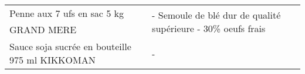 \begin{longtable}{p{5cm}p{10cm}}
                                                                  Penne aux 7 ufs en sac 5 kg GRAND MERE &                                                                                                                                                                                                                                                                                                                                                                                                                                                                                                                                                                                                                                                                                                                                                                                                                                                                                                                                                                            - Semoule de blé dur de qualité supérieure  - 30\% oeufs frais \\
                                                           Sauce soja sucrée en bouteille 975 ml KIKKOMAN &                                                                                                                                                                                                                                                                                                                                                                                                                                                                                                                                                                                                                                                                                                                                                                                                                                                                                                                                                                                                                                        - \\

\end{longtable}
